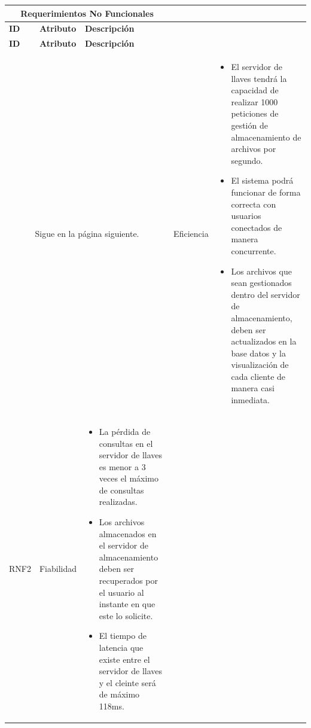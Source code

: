 \begin{longtable}{| p{1.5cm} | p{3cm} | p{11cm} |}

\hline
\multicolumn{3}{|c|}{\textbf{Requerimientos No Funcionales}} \\ \hline
\textbf{ID} &  \textbf{Atributo} & \textbf{Descripción}\\
\hline \hline
\endfirsthead

\hline
\textbf{ID} &  \textbf{Atributo} & \textbf{Descripción}\\
\hline \hline
\endhead

\multicolumn{3}{|c|}{Sigue en la página siguiente.}
\endfoot

\endlastfoot

RNF1 & Eficiencia &  \begin{itemize} 
   \item El servidor de llaves tendrá la capacidad de realizar 1000 peticiones de gestión de almacenamiento de archivos por segundo. 
   \item El sistema podrá funcionar de forma correcta con usuarios conectados de manera concurrente. 
   \item Los archivos que sean gestionados dentro del servidor de almacenamiento, deben ser actualizados en la base datos y la visualización de cada cliente de manera casi inmediata. 
  \end{itemize}
\\ \hline

RNF2 & Fiabilidad &  \begin{itemize} 
  \item La pérdida de consultas en el servidor de llaves es menor a 3 veces el máximo de consultas realizadas. 
   \item Los archivos almacenados en el servidor de almacenamiento deben ser recuperados por el usuario al instante en que este lo solicite. 
   \item El tiempo de latencia que existe entre el servidor de llaves y el cleinte será de máximo 118ms. 
 \end{itemize}
\\ \hline


\end{longtable}

